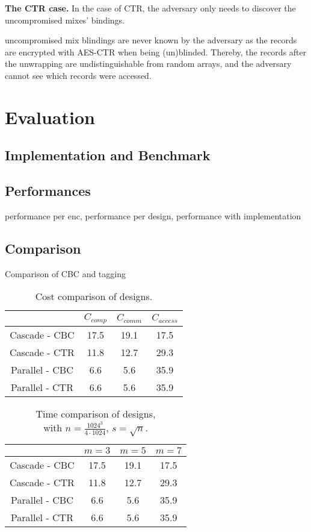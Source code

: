 \documentclass{llncs}
\begin{document}
\noindent\textbf{The CTR case.}
In the case of CTR, the adversary only needs to discover the uncompromised mixes' bindings. 

uncompromised mix blindings are never known by the adversary as the records are encrypted with AES-CTR when being (un)blinded. Thereby, the records after the unwrapping are undistinguishable from random arrays, and the adversary cannot see which records were accessed.

\section{Evaluation}\label{Evaluation}
\subsection{Implementation and Benchmark}\label{Implementation}
\subsection{Performances}\label{Performance}
performance per enc, performance per design, performance with implementation
\subsection{Comparison}\label{Comparison}
Comparison of CBC and tagging

\begin{table}
\centering
\begin{tabular}{*4c}
\toprule
    				& $C_{comp}$  	 & $C_{comm}$		& $C_{access}$\\
\midrule
Cascade - CBC   &  17.5 		& 19.1   		& 17.5  \\
Cascade - CTR   &  11.8 		& 12.7   		& 29.3  \\
Parallel - CBC  &  6.6  		&  5.6   		& 35.9  \\
Parallel - CTR  &  6.6  		&  5.6   		& 35.9  \\
\bottomrule
\end{tabular}
\caption{Cost comparison of designs.}
\end{table}
\quad
\begin{table}
\centering
\begin{tabular}{*4c}
\toprule
    				& $m=3$  	 & $m=5$		& $m=7$\\
\midrule
Cascade - CBC   &  17.5 		& 19.1   		& 17.5  \\
Cascade - CTR   &  11.8 		& 12.7   		& 29.3  \\
Parallel - CBC  &  6.6  		&  5.6   		& 35.9  \\
Parallel - CTR  &  6.6  		&  5.6   		& 35.9  \\
\bottomrule
\end{tabular}
\caption{Time comparison of designs,\\with $n=\frac{1024^3}{4\cdot 1024}$, $s=\sqrt n$.}
\end{table}
\end{document}
